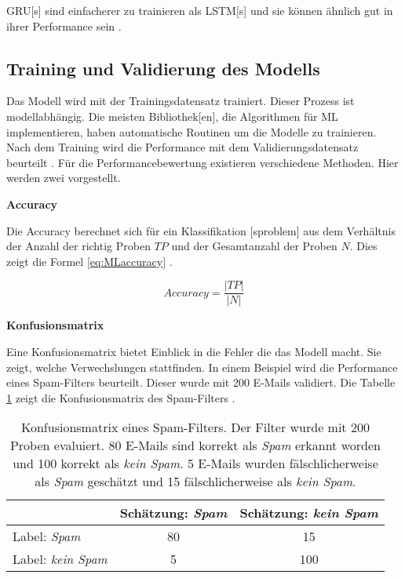 \acrshort{GRU}[s] sind einfacherer zu trainieren als \acrshort{LSTM}[s] und sie können ähnlich gut in ihrer Performance sein \cite{Lazzeri.2021, Goodfellow.2016}. 



\subsection{Training und Validierung des Modells} \label{sec:ML Metriken, Valid}
Das Modell wird mit der \gls{Trainingsdatensatz} trainiert. Dieser Prozess ist modellabhängig. Die meisten \gls{Bibliothek}[en], die Algorithmen für \gls{ML} implementieren, haben automatische Routinen um die Modelle zu trainieren. Nach dem Training wird die Performance mit dem Validierungsdatensatz beurteilt \cite{Burkov.2019, Geron.2019, Zheng.2015}. Für die Performancebewertung existieren verschiedene Methoden. Hier werden zwei vorgestellt. \dubpar

\textbf{\gls{Accuracy}}\par

Die \gls{Accuracy} berechnet sich für ein \gls{Klassifikation} [sproblem] aus dem Verhältnis der Anzahl der richtig  Proben \(TP\) und der Gesamtanzahl der Proben \(N\). Dies zeigt die Formel \ref{eq:MLaccuracy} \cite{Zheng.2015}.

\begin{equation}
Accuracy = \frac{|TP|}{|N|}
\label{eq:MLaccuracy}
\end{equation}

\textbf{\gls{Konfusionsmatrix}}\par
Eine \gls{Konfusionsmatrix} bietet Einblick in die Fehler die das Modell macht. Sie zeigt, welche Verwechslungen stattfinden. In einem Beispiel wird die Performance eines Spam-Filters beurteilt. Dieser wurde mit 200 E-Mails validiert. Die Tabelle \ref{tab:bspConfMat} zeigt die \gls{Konfusionsmatrix} des Spam-Filters \cite{Zheng.2015}.

\begin{table}[h]
    \centering
    \begin{tabular}{|l|c|c|}
        \hline
                                    & Schätzung: \textit{Spam} & Schätzung: \textit{kein Spam}\\
        \hline
        Label: \textit{Spam}        & 80 & 15 \\
        \hline
        Label: \textit{kein Spam}   &  5 & 100\\
        \hline
    \end{tabular}
    \caption{\gls{Konfusionsmatrix} eines Spam-Filters. Der Filter wurde mit 200 Proben evaluiert. 80 E-Mails sind korrekt als \textit{Spam} erkannt worden und 100 korrekt als \textit{kein Spam}. 5 E-Mails wurden fälschlicherweise als \textit{Spam} geschätzt und 15 fälschlicherweise als \textit{kein Spam}.}
    \label{tab:bspConfMat}
\end{table}

